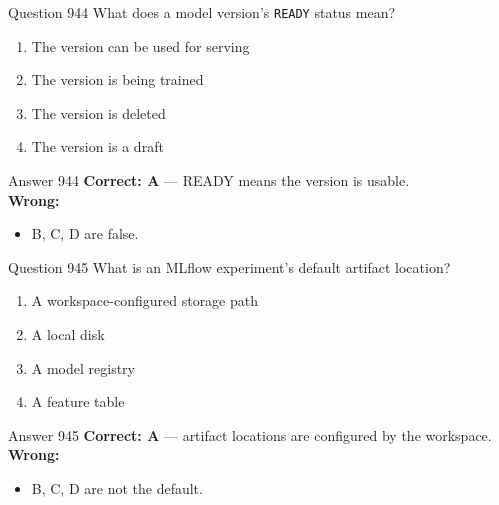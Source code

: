 \documentclass[aspectratio=169,11pt]{beamer}
\begin{document}
	\begin{frame}{Question 944}
		What does a model version's \texttt{READY} status mean?
		\begin{enumerate}[label=\Alph*.]
			\item The version can be used for serving
			\item The version is being trained
			\item The version is deleted
			\item The version is a draft
		\end{enumerate}
	\end{frame}
	\begin{frame}{Answer 944}
		\textbf{Correct: A} --- READY means the version is usable.\\
		\vspace{0.5em}
		\textbf{Wrong:}
		\begin{itemize}
			\item B, C, D are false.
		\end{itemize}
	\end{frame}
	
	\begin{frame}{Question 945}
		What is an MLflow experiment's default artifact location?
		\begin{enumerate}[label=\Alph*.]
			\item A workspace-configured storage path
			\item A local disk
			\item A model registry
			\item A feature table
		\end{enumerate}
	\end{frame}
	\begin{frame}{Answer 945}
		\textbf{Correct: A} --- artifact locations are configured by the workspace.\\
		\vspace{0.5em}
		\textbf{Wrong:}
		\begin{itemize}
			\item B, C, D are not the default.
		\end{itemize}
	\end{frame}
	
\end{document}
